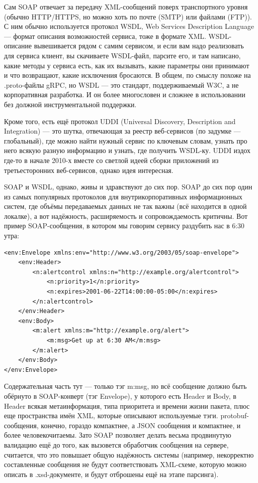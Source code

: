 \documentclass{../../text-style}
\begin{document}
Сам SOAP отвечает за передачу XML-сообщений поверх транспортного уровня (обычно HTTP/HTTPS, но можно хоть по почте (SMTP) или файлами (FTP)). С ним обычно используется протокол WSDL, Web Services Description Language --- формат описания возможностей сервиса, тоже в формате XML. WSDL-описание вывешивается рядом с самим сервисом, и если вам надо реализовать для сервиса клиент, вы скачиваете WSDL-файл, парсите его, и там написано, какие методы у сервиса есть, как их вызывать, какие параметры они принимают и что возвращают, какие исключения бросаются. В общем, по смыслу похоже на .proto-файлы gRPC, но WSDL --- это стандарт, поддерживаемый W3C, а не корпоративная разработка. И он более многословен и сложнее в использовании без должной инструментальной поддержки.

Кроме того, есть ещё протокол UDDI (Universal Discovery, Description and Integration) --- это шутка, отвечающая за реестр веб-сервисов (по задумке --- глобальный), где можно найти нужный сервис по ключевым словам, узнать про него всякую разную информацию и узнать, где получить WSDL-ку. UDDI издох где-то в начале 2010-х вместе со светлой идеей сборки приложений из третьесторонних веб-сервисов, однако идея интересная.

SOAP и WSDL, однако, живы и здравствуют до сих пор. SOAP до сих пор один из самых популярных протоколов для внутрикорпоративных информационных систем, где объёмы передаваемых данных не так важны (всё находится в одной локалке), а вот надёжность, расширяемость и сопровождаемость критичны. Вот пример SOAP-сообщения, в котором мы говорим сервису раздубить нас в 6:30 утра:

\begin{verbatim}
<env:Envelope xmlns:env="http://www.w3.org/2003/05/soap-envelope">
    <env:Header>
        <n:alertcontrol xmlns:n="http://example.org/alertcontrol">
            <n:priority>1</n:priority>
            <n:expires>2001-06-22T14:00:00-05:00</n:expires>
        </n:alertcontrol>
    </env:Header>
    <env:Body>
        <m:alert xmlns:m="http://example.org/alert">
            <m:msg>Get up at 6:30 AM</m:msg>
        </m:alert>
    </env:Body>
</env:Envelope>
\end{verbatim}

Содержательная часть тут --- только тэг m:msg, но всё сообщение должно быть обёрнуто в SOAP-конверт (тэг Envelope), у которого есть Header и Body, в Header всякая метаинформация, типа приоритета и времени жизни пакета, плюс еще пространства имён XML, которые описывают используемые тэги. protobuf-сообщения, конечно, гораздо компактнее, а JSON сообщения и компактнее, и более человекочитаемы. Зато SOAP позволяет делать весьма продвинутую валидацию ещё до того, как вызовется обработчик сообщения на сервере, считается, что это повышает общую надёжность системы (например, некорректно составленные сообщения не будут соответствовать XML-схеме, которую можно описать в .xsd-документе, и будут отброшены ещё на этапе парсинга).
\end{document}
